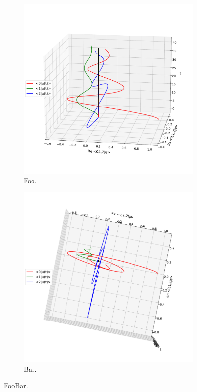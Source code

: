 \begin{figure}[h]
  \begin{subfigure}[b]{\textwidth}
    \centering
    \includegraphics[height=0.41\textheight,clip,trim=0 90 40 140]{img/3ldetect/NonHermitianSpaceTime_side.pdf}
    \caption{Foo.}
  \end{subfigure}
  \par\bigskip
  \begin{subfigure}[b]{\textwidth}
    \centering
    \includegraphics[height=0.44\textheight,clip,trim= 0 90 20 75]{img/3ldetect/NonHermitianSpaceTime_top.pdf}
    \caption{Bar.}
  \end{subfigure}
  \caption{FooBar.}
\end{figure}

